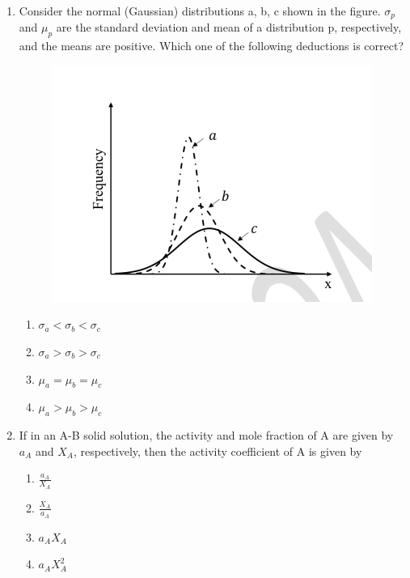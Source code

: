 \documentclass[journal]{IEEEtran}
\theoremstyle{remark}
\begin{document}
\begin{enumerate}[resume]
\item Consider the normal (Gaussian) distributions a, b, c shown in the figure. $\sigma_p$ and $\mu_p$ are the standard deviation and mean of a distribution p, respectively, and the means are positive. Which one of the following deductions is correct? \hfill{}
\begin{figure}[H]
    \centering
    \includegraphics[width=0.4\columnwidth]{figs/Q.13.png}
    \caption{}
    \label{fig:placeholder}
\end{figure}
\begin{multicols}{2}
\begin{enumerate}
\item $\sigma_a < \sigma_b < \sigma_c$
\item $\sigma_a > \sigma_b > \sigma_c$
\item $\mu_a = \mu_b = \mu_c$
\item $\mu_a > \mu_b > \mu_c$
\end{enumerate}
\end{multicols}
\item If in an A-B solid solution, the activity and mole fraction of A are given by $a_A$ and $X_A$, respectively, then the activity coefficient of A is given by \hfill{}
\begin{multicols}{4}
\begin{enumerate}
\item $\frac{a_A}{X_A}$
\item $\frac{X_A}{a_A}$
\item $a_A X_A$
\item $a_A X_A^2$
\end{enumerate}
\end{multicols}


\end{enumerate}
\end{document}
